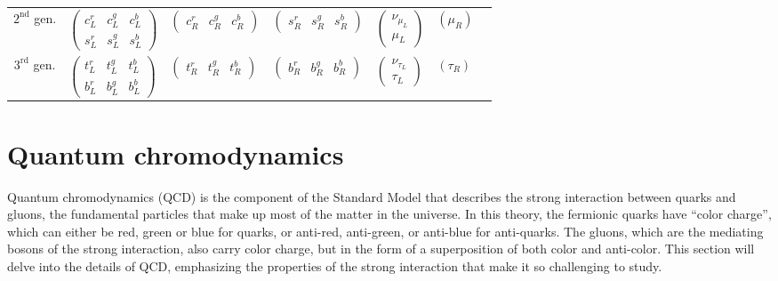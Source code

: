 \begin{table}
{\begin{tabular}{c|llllll}
$2^{\text{nd}}$ gen. & $\left(\begin{array}{lllll}c_L^r & c_L^g & c_L^b \\
s_L^r & s_L^g & s_L^b\end{array}\right)$ & $\left(\begin{array}{llll}c_R^r & c_R^g & c_R^b\end{array}\right)$ & $\left(\begin{array}{llll}s_R^r & s_R^g & s_R^b\end{array}\right)$ & $\left(\begin{array}{c}\nu_{\mu_L} \\
\mu_L\end{array}\right)$ & $\left(\mu_R\right)$ \\
$3^{\text{rd}}$ gen. & $\left(\begin{array}{llll}t_L^r & t_L^g & t_L^b \\
b_L^r & b_L^g & b_L^b\end{array}\right)$ & $\left(\begin{array}{llll}t_R^r & t_R^g & t_R^b\end{array}\right)$ & $\left(\begin{array}{lll}b_R^r & b_R^g & b_R^b\end{array}\right)$ & $\left(\begin{array}{c}\nu_{\tau_L} \\
\tau_L\end{array}\right)$ & $\left(\tau_R\right)$

\end{tabular}}
\label{tab:fermions}
\end{table}


\section{Quantum chromodynamics}
\label{sec:qcd}

Quantum chromodynamics (QCD) is the component of the Standard Model that describes the strong interaction between quarks and gluons, the fundamental particles that make up most of the matter in the universe. In this theory, the fermionic quarks have ``color charge'', which can either be red, green or blue for quarks, or anti-red, anti-green, or anti-blue for anti-quarks. The gluons, which are the mediating bosons of the strong interaction, also carry color charge, but in the form of a superposition of both color and anti-color. This section will delve into the details of QCD, emphasizing the properties of the strong interaction that make it so challenging to study.

